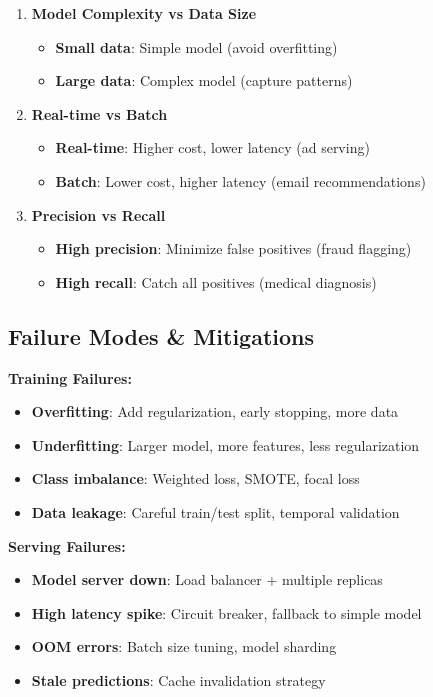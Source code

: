 \documentclass[8pt,landscape]{article}
\begin{document}
\begin{multicols}{3}
\begin{enumerate}
\item \textbf{Model Complexity vs Data Size}
\begin{itemize}
\item \textbf{Small data}: Simple model (avoid overfitting)
\item \textbf{Large data}: Complex model (capture patterns)
\end{itemize}

\item \textbf{Real-time vs Batch}
\begin{itemize}
\item \textbf{Real-time}: Higher cost, lower latency (ad serving)
\item \textbf{Batch}: Lower cost, higher latency (email recommendations)
\end{itemize}

\item \textbf{Precision vs Recall}
\begin{itemize}
\item \textbf{High precision}: Minimize false positives (fraud flagging)
\item \textbf{High recall}: Catch all positives (medical diagnosis)
\end{itemize}
\end{enumerate}

\subsection*{Failure Modes \& Mitigations}

\textbf{Training Failures:}
\begin{itemize}
\item \textbf{Overfitting}: Add regularization, early stopping, more data
\item \textbf{Underfitting}: Larger model, more features, less regularization
\item \textbf{Class imbalance}: Weighted loss, SMOTE, focal loss
\item \textbf{Data leakage}: Careful train/test split, temporal validation
\end{itemize}

\textbf{Serving Failures:}
\begin{itemize}
\item \textbf{Model server down}: Load balancer + multiple replicas
\item \textbf{High latency spike}: Circuit breaker, fallback to simple model
\item \textbf{OOM errors}: Batch size tuning, model sharding
\item \textbf{Stale predictions}: Cache invalidation strategy
\end{itemize}


\end{multicols}
\end{document}
